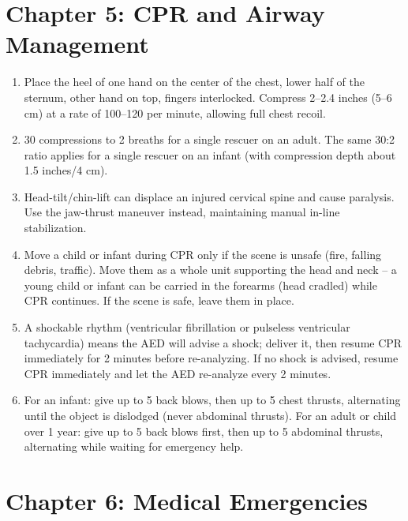 \section*{Chapter 5: CPR and Airway Management}

\begin{enumerate}[leftmargin=*]
\item Place the heel of one hand on the center of the chest, lower half of the sternum, other hand on top, fingers interlocked. Compress 2--2.4 inches (5--6 cm) at a rate of 100--120 per minute, allowing full chest recoil.
\item 30 compressions to 2 breaths for a single rescuer on an adult. The same 30:2 ratio applies for a single rescuer on an infant (with compression depth about 1.5 inches/4 cm).
\item Head-tilt/chin-lift can displace an injured cervical spine and cause paralysis. Use the jaw-thrust maneuver instead, maintaining manual in-line stabilization.
\item Move a child or infant during CPR only if the scene is unsafe (fire, falling debris, traffic). Move them as a whole unit supporting the head and neck -- a young child or infant can be carried in the forearms (head cradled) while CPR continues. If the scene is safe, leave them in place.
\item A shockable rhythm (ventricular fibrillation or pulseless ventricular tachycardia) means the AED will advise a shock; deliver it, then resume CPR immediately for 2 minutes before re-analyzing. If no shock is advised, resume CPR immediately and let the AED re-analyze every 2 minutes.
\item For an infant: give up to 5 back blows, then up to 5 chest thrusts, alternating until the object is dislodged (never abdominal thrusts). For an adult or child over 1 year: give up to 5 back blows first, then up to 5 abdominal thrusts, alternating while waiting for emergency help.
\end{enumerate}

\section*{Chapter 6: Medical Emergencies}

